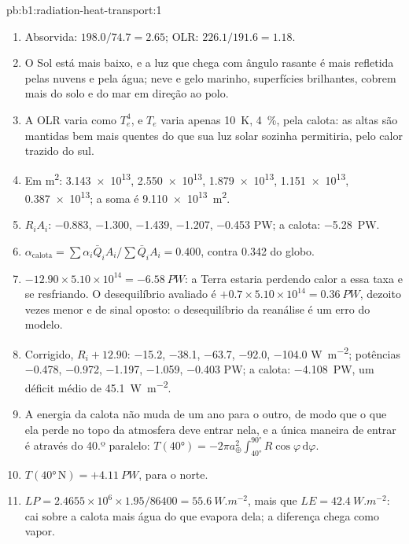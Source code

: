 \begin{solution}{pb:b1:radiation-heat-transport:1}
\begin{enumerate}
        \num{242.9}, \num{241.1} \unit{K}.
  \item Absorvida: $198.0/74.7 = 2.65$; OLR: $226.1/191.6 = 1.18$.
  \item O Sol está mais baixo, e a luz que chega com ângulo rasante é mais refletida pelas nuvens e
        pela água; neve e gelo marinho, superfícies brilhantes, cobrem mais do solo e do mar em
        direção ao polo.
  \item A OLR varia como $T_e^4$, e $T_e$ varia apenas \qty{10}{K}, \qty{4}{\percent}, pela calota:
        as altas  são mantidas bem mais quentes do que sua luz solar sozinha permitiria,
        pelo calor trazido do sul.
  \item Em \unit{m^2}: \num{3.143e13}, \num{2.550e13}, \num{1.879e13}, \num{1.151e13},
        \num{0.387e13}; a soma é \qty{9.110e13}{m^2}.
  \item $R_iA_i$: \num{-0.883}, \num{-1.300}, \num{-1.439}, \num{-1.207}, \num{-0.453}
        \unit{PW}; a calota: \qty{-5.28}{PW}.
  \item $\alpha_\text{calota} = \sum\alpha_i\bar Q_iA_i/\sum\bar Q_iA_i = 0.400$, contra \num{0.342}
        do globo.
  \item $-12.90 \times 5.10\times10^{14} = \qty{-6.58}{PW}$: a Terra estaria perdendo calor a essa
        taxa e se resfriando. O desequilíbrio avaliado é $+0.7 \times 5.10\times10^{14} = \qty{+0.36}{PW}$, dezoito vezes menor e de sinal oposto: o desequilíbrio da reanálise é um
        erro do modelo.
  \item Corrigido, $R_i + 12.90$: \num{-15.2}, \num{-38.1}, \num{-63.7}, \num{-92.0},
        \num{-104.0} \unit{W.m^{-2}}; potências \num{-0.478}, \num{-0.972}, \num{-1.197},
        \num{-1.059}, \num{-0.403} \unit{PW}; a calota: \qty{-4.108}{PW}, um déficit médio de
        \qty{45.1}{W.m^{-2}}.
  \item A energia da calota não muda de um ano para o outro, de modo que o que ela perde no topo da
        atmosfera deve entrar nela, e a única maneira de entrar é através do 40.º paralelo:
        $T(\ang{40}) = -2\pi a_\oplus^2\int_{\ang{40}}^{\ang{90}}
        R\cos\varphi\,\mathrm d\varphi$.
  \item $T(\ang{40}\,\text{N}) = +\qty{4.11}{PW}$, para o norte.
  \item $LP = 2.4655\times10^6 \times 1.95/86400 = \qty{55.6}{W.m^{-2}}$, mais que
        $LE = \qty{42.4}{W.m^{-2}}$: cai sobre a calota mais água do que evapora dela; a diferença
        chega como vapor.

\end{enumerate}
\end{solution}
